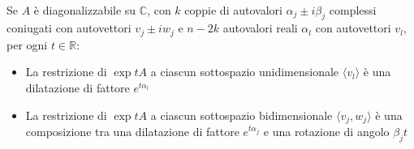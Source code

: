 \documentclass[11pt,a4paper,twoside]{book}
\newenvironment{proposizione}[1][\empty]{\begin{Proposizione}{
\ifx\empty#1\relax\else\mdseries\itshape#1\\\fi
}{}}{\end{Proposizione}}
\theoremstyle{esss}
\theoremstyle{dotless}
\numberwithin{equation}{section} %
\begin{document}
\begin{proposizione}\label{proposizioneRestrizioneMatriceSottospaziInvarianti}Se $A$ è diagonalizzabile su $\mathbb{C}$, con $k$ coppie di autovalori $\alpha_j\pm i\beta_j$ complessi coniugati con autovettori $v_j \pm iw_j$ e $n-2k$ autovalori reali $\alpha_l$ con autovettori $v_l$, per ogni $t\in\mathbb{R}$:
\begin{itemize}
\item La restrizione di $\exp{tA}$ a ciascun sottospazio unidimensionale $\langle v_l \rangle$ è una dilatazione di fattore $e^{t\alpha_l}$
\item La restrizione di $\exp{tA}$ a ciascun sottospazio bidimensionale $\langle v_j,w_j \rangle$ è una composizione tra una dilatazione di fattore $e^{t\alpha_j}$ e  una rotazione di angolo $\beta_j t$
\end{itemize}
\end{proposizione}
\end{document}
